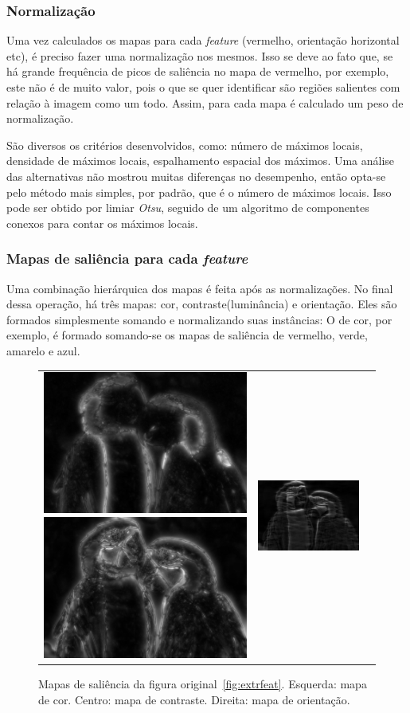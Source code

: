 \documentclass[11pt]{article}
\newcommand{\tit}[1]{\textit{#1}}
\begin{document}
\subsubsection{Normalização}
Uma vez calculados os mapas para cada \tit{feature} (vermelho,
orientação horizontal etc), é preciso fazer uma normalização nos mesmos.
Isso se deve ao fato que, se há grande frequência de picos de saliência
no mapa de vermelho, por exemplo, este não é de muito valor, pois o que se
quer identificar são regiões salientes com relação à imagem como um todo.
Assim, para cada mapa é calculado um peso de normalização.

São diversos os critérios desenvolvidos, como: número de máximos locais,
densidade de máximos locais, espalhamento espacial dos máximos.
Uma análise das alternativas não mostrou muitas diferenças no desempenho,
então opta-se pelo método mais simples, por padrão, que é o número de máximos
locais. Isso pode ser obtido por limiar \tit{Otsu}, seguido de um algoritmo
de componentes conexos para contar os máximos locais.

\subsubsection{Mapas de saliência para cada \tit{feature}}
Uma combinação hierárquica dos mapas é feita após as normalizações.
No final dessa operação, há três mapas: cor, contraste(luminância)
e orientação.
Eles são formados simplesmente somando e normalizando suas instâncias:
O de cor, por exemplo, é formado somando-se os mapas de saliência de
vermelho, verde, amarelo e azul.
\begin{figure}[hbt]
\begin{center}
		\begin{tabular} {ccc}
            \includegraphics[width=0.3\linewidth]{img/arara_col_map.png}
            \includegraphics[width=0.3\linewidth]{img/arara_cst_map.png} &
            \includegraphics[width=0.3\linewidth]{img/arara_ort_map.png}
		\end{tabular}
\end{center}
\caption{Mapas de saliência da figura original~\ref{fig:extrfeat}.
    Esquerda: mapa de cor. Centro: mapa de contraste. Direita: mapa de
orientação.}
\label{fig:maps}
\end{figure}
\end{document}
